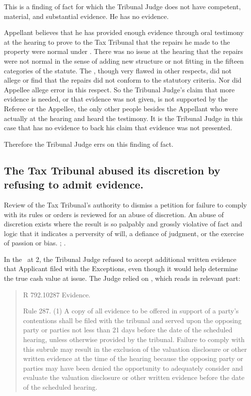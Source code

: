\documentclass[12pt,\documentclassflag]{michiganCourtOfAppealsBrief}
\def\mathieuGast{\pincite[l]{MCL}{211.27(2)}}
\def\ttr287{\pincite[s]{TTR}{287}}
\begin{document}
This is a finding of fact for which the Tribunal Judge does not have competent, material, and substantial evidence. He has no evidence.

Appellant believes that he has provided enough evidence through oral testimony at the hearing to prove to the Tax Tribunal that the repairs he made to the property were normal under \mathieuGast. There was no issue at the hearing that the repairs were not normal in the sense of adding new structure or not fitting in the fifteen categories of the statute. The \POJ, though very flawed in other respects, did not allege or find that the repairs did not conform to the statutory criteria. Nor did Appellee allege error in this respect. So the Tribunal Judge's claim that more evidence is needed, or that evidence was not given, is not supported by the Referee or the Appellee, the only other people besides the Appellant who were actually at the hearing and heard the testimony. It is the Tribunal Judge in this case that has no evidence to back his claim that evidence was not presented.

Therefore the Tribunal Judge errs on this finding of fact.

\subsection{The Tax Tribunal abused its discretion by refusing to admit evidence.}
Review of the Tax Tribunal's authority to dismiss a petition for failure to comply with its rules or orders is reviewed for an abuse of discretion.  An abuse of discretion exists where the result is so palpably and grossly violative of fact and logic that it indicates a perversity of will, a defiance of judgment, or the exercise of passion or bias. ; .

In the \FOJ\ at 2, the Tribunal Judge refused to accept additional written evidence that Applicant filed with the Exceptions, even though it would help determine the true cash value at issue. The Judge relied on \ttr287, which reads in relevant part: 

\begin{quote}
  R 792.10287 Evidence. 
  
  Rule 287. (1) A copy of all evidence to be offered in support of a party's contentions shall be filed with the tribunal and served upon the opposing party or parties not less than 21 days before the date of the scheduled hearing, unless otherwise provided by the tribunal. Failure to comply with this subrule may result in the exclusion of the valuation disclosure or other written evidence at the time of the hearing because the opposing party or parties may have been denied the opportunity to adequately consider and evaluate the valuation disclosure or other written evidence before the date of the scheduled hearing. 
\end{quote}
\end{document}
